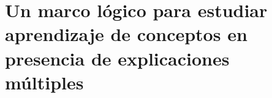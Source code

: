 

\chapter{Un marco lógico para estudiar aprendizaje de conceptos en presencia de explicaciones múltiples}\label{chapter:BRM}


\begin{abstract}

\end{abstract}
